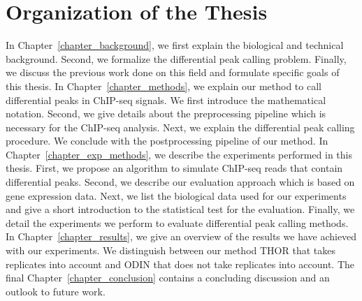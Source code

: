 \section{Organization of the Thesis}
In Chapter~\ref{chapter_background}, we first explain the biological and technical background.
Second, we formalize the differential peak calling problem.
Finally, we discuss the previous work done on this field and formulate specific goals of this thesis.
In Chapter~\ref{chapter_methods}, we explain our method to call differential peaks in ChIP-seq signals.
We first introduce the mathematical notation.
Second, we give details about the preprocessing pipeline which is necessary for the ChIP-seq analysis.
Next, we explain the differential peak calling procedure.
We conclude with the postprocessing pipeline of our method.
In Chapter~\ref{chapter_exp_methods}, we describe the experiments performed in this thesis.
First, we propose an algorithm to simulate ChIP-seq reads that contain differential peaks.
Second, we describe our evaluation approach which is based on gene expression data.
Next, we list the biological data used for our experiments and give a short introduction to the statistical test for the evaluation.
Finally, we detail the experiments we perform to evaluate differential peak calling methods.
In Chapter~\ref{chapter_results}, we give an overview of the results we have achieved with our experiments.
We distinguish between our method THOR that takes replicates into account and ODIN that does not take replicates into account.
The final Chapter~\ref{chapter_conclusion} contains a concluding discussion and an outlook to future work.


